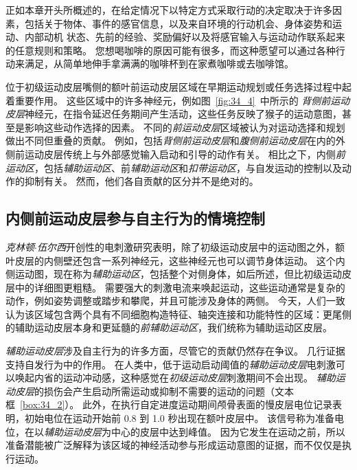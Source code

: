 正如本章开头所概述的，在给定情况下以特定方式采取行动的决定取决于许多因素，包括关于物体、事件的感官信息，以及来自环境的行动机会、身体姿势和运动、内部动机 状态、先前的经验、奖励偏好以及将感官输入与运动动作联系起来的任意规则和策略。
您想喝咖啡的原因可能有很多，而这种愿望可以通过各种行动来满足，从简单地伸手拿满满的咖啡杯到在家煮咖啡或去咖啡馆。


位于初级运动皮层嘴侧的额叶前运动皮层区域在早期运动规划或任务选择过程中起着重要作用。
这些区域中的许多神经元，例如图~\ref{fig:34_4}~中所示的 \textit{背侧前运动皮层}神经元，在指令延迟任务期间产生活动，这些任务反映了猴子的运动意图，甚至是影响这些动作选择的因素。
不同的\textit{前运动皮层}区域被认为对运动选择和规划做出不同但重叠的贡献。
例如，包括\textit{背侧前运动皮层}和\textit{腹侧前运动皮层}在内的外侧前运动皮层传统上与外部感觉输入启动和引导的动作有关。
相比之下，内侧\textit{前运动区}，包括\textit{辅助运动区}、前\textit{辅助运动区}和\textit{扣带运动区}，与自发运动的控制以及动作的抑制有关。
然而，他们各自贡献的区分并不是绝对的。



\subsection{内侧前运动皮层参与自主行为的情境控制}

\textit{克林顿$\cdot$伍尔西}开创性的电刺激研究表明，除了初级运动皮层中的运动图之外，额叶皮层的内侧壁还包含一系列神经元，这些神经元也可以调节身体运动。
这个内侧运动图，现在称为\textit{辅助运动区}，包括整个对侧身体，如后所述，但比初级运动皮层中的详细图更粗糙。
需要强大的刺激电流来唤起运动，这些运动通常是复杂的动作，例如姿势调整或踏步和攀爬，并且可能涉及身体的两侧。
今天，人们一致认为该区域包含两个具有不同细胞构造特征、轴突连接和功能特性的区域：更尾侧的辅助运动皮层本身和更延髓的\textit{前辅助运动区}，我们统称为辅助运动区皮层。


\textit{辅助运动皮层}涉及自主行为的许多方面，尽管它的贡献仍然存在争议。
几行证据支持自发行为中的作用。
在人类中，低于运动启动阈值的\textit{辅助运动皮层}电刺激可以唤起内省的运动冲动感，这种感觉在\textit{初级运动皮层}刺激期间不会出现。
\textit{辅助运动皮层}的损伤会产生启动所需运动或抑制不需要的运动的问题（文本框~\ref{box:34_2}）。
此外，在执行自定进度运动期间颅骨表面的慢皮层电位记录表明，初始电位在运动开始前 0.8 到 1.0 秒出现在额叶皮层中。
该信号称为准备电位，在以\textit{辅助运动皮层}为中心的皮层中达到峰值。
因为它发生在运动之前，所以准备潜能被广泛解释为该区域的神经活动参与形成运动意图的证据，而不仅仅是执行运动。



